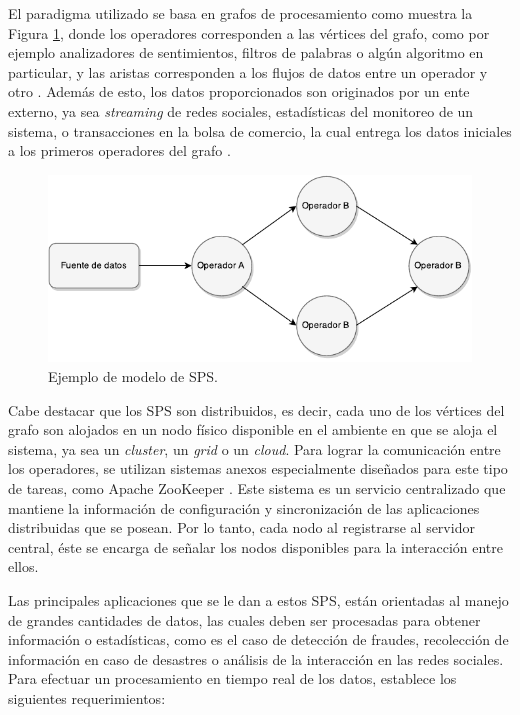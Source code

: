El paradigma utilizado se basa en grafos de procesamiento como muestra la Figura \ref{fig:grafo}, donde los operadores corresponden a las vértices del grafo, como por ejemplo analizadores de sentimientos, filtros de palabras o algún algoritmo en particular, y las aristas corresponden a los flujos de datos entre un operador y otro \citep{Shahrivari14}. Además de esto, los datos proporcionados son originados por un ente externo, ya sea \textit{streaming} de redes sociales, estadísticas del monitoreo de un sistema, o transacciones en la bolsa de comercio, la cual entrega los datos iniciales a los primeros operadores del grafo \citep{AppelFFB12}.

\begin{figure}[ht!]
  \centering
    \includegraphics[scale=1]{images/SPS.pdf}
  \caption{Ejemplo de modelo de SPS.}
  \label{fig:grafo}
\end{figure}

Cabe destacar que los SPS son distribuidos, es decir, cada uno de los vértices del grafo son alojados en un nodo físico disponible en el ambiente en que se aloja el sistema, ya sea un \textit{cluster}, un \textit{grid} o un \textit{cloud}. Para lograr la comunicación entre los operadores, se utilizan sistemas anexos especialmente diseñados para este tipo de tareas, como Apache ZooKeeper \citep{HuntKJR10}. Este sistema es un servicio centralizado que mantiene la información de configuración y sincronización de las aplicaciones distribuidas que se posean. Por lo tanto, cada nodo al registrarse al servidor central, éste se encarga de señalar los nodos disponibles para la interacción entre ellos.

Las principales aplicaciones que se le dan a estos SPS, están orientadas al manejo de grandes cantidades de datos, las cuales deben ser procesadas para obtener información o estadísticas, como es el caso de detección de fraudes, recolección de información en caso de desastres o análisis de la interacción en las redes sociales. Para efectuar un procesamiento en tiempo real de los datos, \citep{StonebrakerCZ05} establece los siguientes requerimientos:

